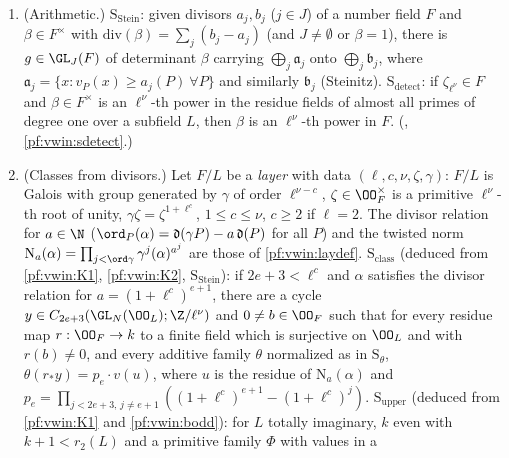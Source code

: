 \begin{enumerate}[label=(K\arabic*)]
$\theta_V\bigl(P_g(\chi_x)_*z_{q,e}\bigr)=x^{e+1}v(\det g)$ for all $V$, $g\in\GL(V)$, $x\in\N$, where $\chi_x$ is the scalar character
$c\mapsto\zeta^{xc}$. $\mathrm{S}_\phi$: additive families pulled back along reduction maps $\GL_n(R)\to\GL_n(k)$ form primitive families
(compatible with stabilization, multiplied by $d$ under $\psi_d$, vanishing on boundaries). (,
, , .)
\item\label{pf:vwin:K4} (Arithmetic.) $\mathrm{S}_{\mathrm{Stein}}$: given divisors $a_j,b_j$ ($j\in J$) of a number field $F$ and $\beta\in F^\times$ with
$\mathrm{div}(\beta)=\sum_j(b_j-a_j)$ (and $J\ne\emptyset$ or $\beta=1$), there is $g\in\GL_J(F)$ of determinant $\beta$ carrying
$\bigoplus_j\mathfrak a_j$ onto $\bigoplus_j\mathfrak b_j$, where $\mathfrak a_j=\{x:v_P(x)\ge a_j(P)\ \forall P\}$ and similarly $\mathfrak b_j$
(Steinitz). $\mathrm{S}_{\mathrm{detect}}$: if $\zeta_{\ell^\nu}\in F$ and $\beta\in F^\times$ is an $\ell^\nu$-th power in
the residue fields of almost all primes of degree one over a subfield $L$, then $\beta$ is an $\ell^\nu$-th power in $F$.
(, \cref{pf:vwin:sdetect}.)
\item\label{pf:vwin:K5} (Classes from divisors.) Let $F/L$ be a \emph{layer} with data $(\ell,c,\nu,\zeta,\gamma)$: $F/L$ is Galois with group generated by
$\gamma$ of order $\ell^{\nu-c}$, $\zeta\in\OO_F^\times$ is a primitive $\ell^\nu$-th root of unity, $\gamma\zeta=\zeta^{1+\ell^c}$, $1\le c\le\nu$, $c\ge2$ if
$\ell=2$. The divisor relation for $a\in\N$ ($\ord_P(\alpha)=\mathfrak d(\gamma P)-a\,\mathfrak d(P)$ for all $P$) and the twisted
norm $\mathrm{N}_a(\alpha)=\prod_{j<\ord\gamma}\gamma^j(\alpha)^{a^j}$ are those of \cref{pf:vwin:laydef}. $\mathrm{S}_{\mathrm{class}}$ (deduced from \ref{pf:vwin:K1},
\ref{pf:vwin:K2}, $\mathrm{S}_{\mathrm{Stein}}$): if $2e+3<\ell^c$ and $\alpha$ satisfies the divisor relation for $a=(1+\ell^c)^{e+1}$, there are a cycle
$y\in C_{2e+3}(\GL_N(\OO_L);\Z/\ell^\nu)$ and $0\ne b\in\OO_F$ such that for every residue map $r:\OO_F\to k$ to a finite field which is surjective on
$\OO_L$ and with $r(b)\ne0$, and every additive family $\theta$ normalized as in $\mathrm{S}_\theta$, $\theta(r_*y)=p_e\cdot v(u)$, where $u$ is the residue
of $\mathrm{N}_a(\alpha)$ and $p_e=\prod_{j<2e+3,\,j\ne e+1}((1+\ell^c)^{e+1}-(1+\ell^c)^j)$. $\mathrm{S}_{\mathrm{upper}}$ (deduced from
\ref{pf:vwin:K1} and \cref{pf:vwin:bodd}): for $L$ totally imaginary, $k$ even with $k+1<r_2(L)$ and a primitive family $\Phi$ with values in a

\end{enumerate}
